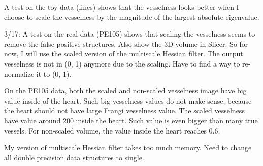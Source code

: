 \documentclass[12pt]{article}
\begin{document}
A test on the toy data (lines) shows that the vesselness looks better when I
choose to scale the vesselness by the magnitude of the largest absolute
eigenvalue.

3/17: A test on the real data (PE105) shows that scaling the vesselness seems
to remove the false-positive structures. Also show the 3D volume in Slicer. So
for now, I will use the scaled version of the multiscale Hessian filter. The
output vesselness is not in (0, 1) anymore due to the scaling. Have to find a
way to re-normalize it to (0, 1). 

On the PE105 data, both the scaled and non-scaled vesselness image have big
value inside of the heart. Such big vesselness values do not make sense,
because the heart should not have large Frangi vesselness value. The scaled
vesselness have value around 200 inside the heart. Such value is even bigger
than many true vessels. For non-scaled volume, the value inside the heart
reaches 0.6, 

My version of multiscale Hessian filter takes too much memory. Need to change
all double precision data structures to single. 
\end{document}
